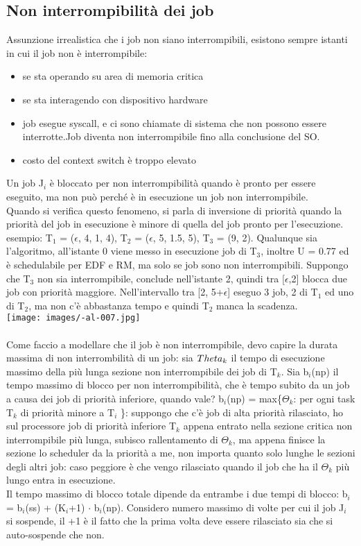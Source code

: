 \documentclass{article}
\begin{document}
\subsection{Non interrompibilità dei job}
Assunzione irrealistica che i job non siano interrompibili, esistono sempre istanti in cui il job non è interrompibile:
\begin{itemize}
\item se sta operando su area di memoria critica
\item se sta interagendo con dispositivo hardware
\item job esegue syscall, e ci sono chiamate di sistema che non possono essere interrotte.Job diventa non interrompibile fino alla conclusione del SO.
\item costo del context switch è troppo elevato
\end{itemize}
Un job J$_{i}$ è bloccato per non interrompibilità quando è  pronto per essere eseguito, ma non può perché è in esecuzione un job non interrompibile.\\ Quando si verifica questo fenomeno, si parla di inversione di priorità quando la priorità del job in esecuzione è minore di quella del job pronto per l'esecuzione. esempio: T$_{1}$ = ($\epsilon$, 4, 1, 4), T$_{2}$ = ($\epsilon$, 5, 1.5, 5), T$_{3}$ = (9, 2). Qualunque sia l'algoritmo, all'istante 0 viene messo in esecuzione job di T$_{3}$, inoltre U = 0.77 ed è schedulabile per EDF e RM, ma solo se job sono non interrompibili. Suppongo che T$_{3}$ non sia interrompibile, conclude nell'istante 2, quindi tra [$\epsilon$,2] blocca due job con priorità maggiore. Nell'intervallo tra [2, 5+$\epsilon$] eseguo 3 job, 2 di T$_{1}$ ed uno di T$_{2}$, ma non c'è abbastanza tempo e quindi T$_{2}$ manca la scadenza.\\ 
\texttt{[image: images/-al-007.jpg]}\\
\\Come faccio a modellare che il job è non interrompibile, devo capire la durata massima di non interrombilità di un job: sia $\\Theta_{k}$ il tempo di esecuzione massimo della più lunga sezione non interrompibile dei job di T$_{k}$. Sia b$_{i}$(np) il tempo massimo di blocco per non interrompibilità, che è tempo subito da un job a causa dei job di priorità inferiore, quando vale? b$_{i}$(np) = max\{$\Theta_{k}$: per ogni task T$_{k}$ di priorità minore a T$_{i}$ \}: suppongo che c'è job di alta priorità rilasciato, ho sul processore job di priorità inferiore T$_{k}$ appena entrato nella sezione critica non interrompibile più lunga, subisco rallentamento di $\Theta_{k}$, ma appena finisce la sezione lo scheduler da la priorità a me, non importa quanto solo lunghe le sezioni degli altri job: caso peggiore è che vengo rilasciato quando il job che ha il $\Theta_{k}$ più lungo entra in esecuzione.\\ Il tempo massimo di blocco totale dipende da entrambe i due tempi di blocco:
b$_{i}$ = b$_{i}$(ss) + (K$_{i}$+1) $\cdot$ b$_{i}$(np). Considero numero massimo di volte per cui il job J$_{i}$ si sospende, il +1 è il fatto che la prima volta deve essere rilasciato sia che si auto-sospende che non.
\end{document}

